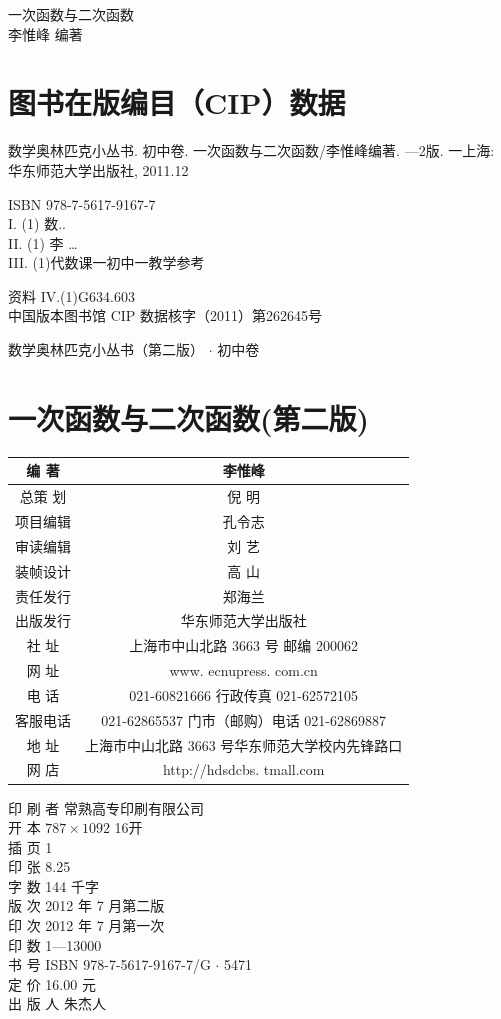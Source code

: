 \documentclass[10pt]{article}
\begin{document}
一次函数与二次函数\\
李惟峰 编著

\section*{图书在版编目（CIP）数据}
数学奥林匹克小丛书. 初中卷. 一次函数与二次函数/李惟峰编著. —2版. 一上海: 华东师范大学出版社, 2011.12

ISBN 978-7-5617-9167-7\\
I. (1) 数..\\
II. (1) 李 …\\
III. (1)代数课一初中一教学参考

资料 IV.(1)G634.603\\
中国版本图书馆 CIP 数据核字（2011）第262645号

数学奥林匹克小丛书（第二版） $\cdot$ 初中卷

\section*{一次函数与二次函数(第二版)}
\begin{center}
\begin{tabular}{|c|c|}
\hline
编 著 & 李惟峰 \\
\hline
总策 划 & 倪 明 \\
\hline
项目编辑 & 孔令志 \\
\hline
审读编辑 & 刘 艺 \\
\hline
装帧设计 & 高 山 \\
\hline
责任发行 & 郑海兰 \\
\hline
出版发行 & 华东师范大学出版社 \\
\hline
社 址 & 上海市中山北路 3663 号 邮编 200062 \\
\hline
网 址 & www. ecnupress. com.cn \\
\hline
电 话 & 021-60821666 行政传真 021-62572105 \\
\hline
客服电话 & 021-62865537 门市（邮购）电话 021-62869887 \\
\hline
地 址 & 上海市中山北路 3663 号华东师范大学校内先锋路口 \\
\hline
网 店 & http://hdsdcbs. tmall.com \\
\hline
\end{tabular}
\end{center}

印 刷 者 常熟高专印刷有限公司\\
开 本 $787 \times 1092$ 16开\\
插 页 1\\
印 张 8.25\\
字 数 144 千字\\
版 次 2012 年 7 月第二版\\
印 次 2012 年 7 月第一次\\
印 数 1—13000\\
书 号 ISBN 978-7-5617-9167-7/G $\cdot$ 5471\\
定 价 16.00 元\\
出 版 人 朱杰人
\end{document}
